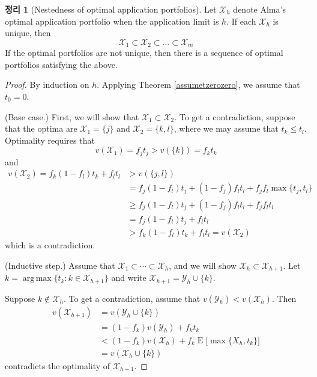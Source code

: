 \documentclass[12pt]{article} %
\DeclareMathOperator*{\argmax}{arg\,max}
\newtheorem{theorem}{Theorem}
\theoremstyle{definition}
\newtheorem{theorem}{정리}
\theoremstyle{definition}
\begin{document}
\begin{theorem}[Nestedness of optimal application portfolios] \label{nestedapplication}
Let $\mathcal{X}_h$ denote Alma’s optimal application portfolio when the application limit is $h$. If each $\mathcal{X}_h$ is unique, then
\begin{equation}
\mathcal{X}_1 \subset \mathcal{X}_2\subset \dots \subset \mathcal{X}_m
\end{equation}
If the optimal portfolios are not unique, then there is a sequence of optimal portfolios satisfying the above.
\end{theorem}
\begin{proof} By induction on $h$. Applying Theorem \ref{assumetzerozero}, we assume that $t_0 = 0$. 

(Base case.) First, we will show that  $\mathcal{X}_1 \subset \mathcal{X}_2$. To get a contradiction, suppose that the optima are $\mathcal{X}_1 = \{j\}$ and $\mathcal{X}_2 = \{k, l\}$, where we may assume that $t_k \leq t_l$. Optimality requires that
\begin{equation}v(\mathcal{X}_1 )  = f_j t_j > v(\{k\}) = f_k t_k\end{equation}
and
\begin{align}
v(\mathcal{X}_2) =  f_k (1- f_l) t_k + f_l t_l &> v(\{j, l\}) \\
& = f_j (1- f_l) t_j + (1- f_j) f_l t_l + f_j f_l \max\{t_j, t_l\} \\
&\geq  f_j (1- f_l) t_j + (1- f_j) f_l t_l + f_j f_l  t_l \\
&= f_j (1- f_l) t_j + f_l t_l  \\
&> f_k (1- f_l) t_k + f_l t_l  = v(\mathcal{X}_2)
\end{align}
which is a contradiction.

(Inductive step.) Assume that $\mathcal{X}_1 \subset \cdots \subset \mathcal{X}_h$, and we will show $\mathcal{X}_h \subset \mathcal{X}_{h+1}$. Let $k = \argmax\{ t_k: k \in \mathcal{X}_{h+1}\}$ and write $\mathcal{X}_{h+1} = \mathcal{Y}_{h} \cup \{k\}$.

Suppose $k \notin \mathcal{X}_h$.  To get a contradiction, assume that $v(\mathcal{Y}_h) < v(\mathcal{X}_h)$. Then
\begin{align}
v(\mathcal{X}_{h+1})&= v(\mathcal{Y}_{h} \cup \{k\}) \\
&= (1 - f_k) v(\mathcal{Y}_h) + f_k t_k \\
& < (1 - f_k) v(\mathcal{X}_h) + f_k \operatorname{E}\bigl[ \max\{X_h, t_k \} \bigr]\\
&=  v(\mathcal{X}_h\cup \{k\})
\end{align}
contradicts the optimality of $\mathcal{X}_{h+1}$.


\end{proof}
\end{document}
